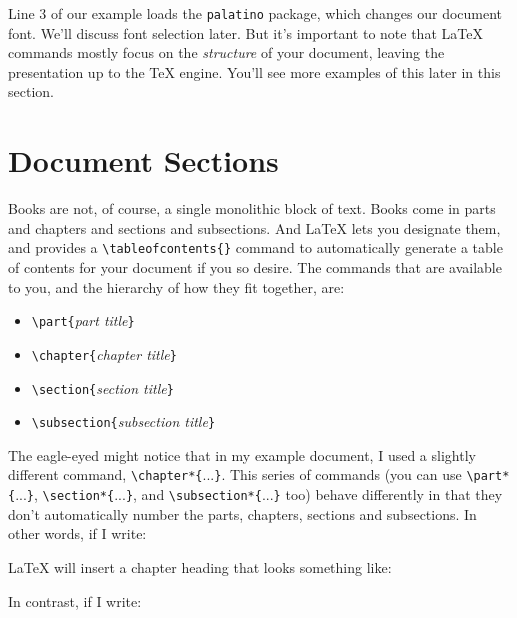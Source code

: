 Line 3 of our example loads the \texttt{palatino} package, which changes our
document font. We'll discuss font selection later. But it's important to note
that \LaTeX{} commands mostly focus on the \emph{structure} of your document,
leaving the presentation up to the \TeX{} engine. You'll see more examples of
this later in this section.

\section{Document Sections} \label{sec:sectioning}

Books are not, of course, a single monolithic block of text. Books come in
parts and chapters and sections and subsections. And LaTeX lets you designate
them, and provides a \texttt{\textbackslash{}tableofcontents\{\}} command to
automatically generate a table of contents for your document if you so
desire. The commands that are available to you, and the hierarchy of how they
fit together, are:

\begin{itemize}
\item \texttt{\textbackslash{}part\{}\emph{part title}\texttt{\}}
\item \texttt{\textbackslash{}chapter\{}\emph{chapter title}\texttt{\}}
\item \texttt{\textbackslash{}section\{}\emph{section title}\texttt{\}}
\item \texttt{\textbackslash{}subsection\{}\emph{subsection title}\texttt{\}}
\end{itemize}

The eagle-eyed might notice that in my example document, I used a slightly
different command, \texttt{\textbackslash{}chapter*\{}...\texttt{\}}. This series of
commands (you can use \texttt{\textbackslash{}part*\{}...\texttt{\}},
\texttt{\textbackslash{}section*\{}...\texttt{\}}, and
\texttt{\textbackslash{}subsection*\{}...\texttt{\}} too) behave differently in that
they don't automatically number the parts, chapters, sections and
subsections. In other words, if I write:


\LaTeX{} will insert a chapter heading that looks something like:


In contrast, if I write:

